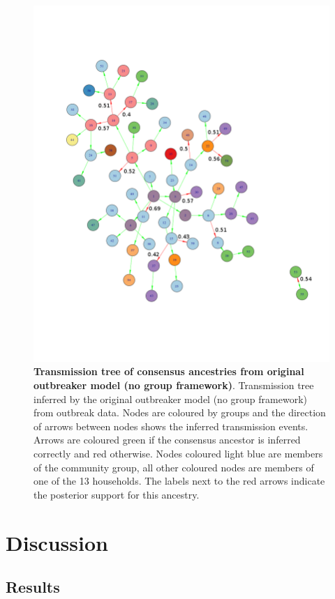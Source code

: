 \documentclass[11pt,a4paper]{report}
\begin{document}
\begin{figure}[h!]
\centering
\includegraphics[scale=0.5]{tree_no_grps.png} \newline
\caption{{\bf Transmission tree of consensus ancestries from original outbreaker model (no group framework)}. Transmission tree inferred by the original outbreaker model (no group framework) from outbreak data. Nodes are coloured by groups and the direction of arrows between nodes shows the inferred transmission events. Arrows are coloured green if the consensus ancestor is inferred correctly and red otherwise. Nodes coloured light blue are members of the community group, all other coloured nodes are members of one of the 13 households. The labels next to the red arrows indicate the posterior support for this ancestry.}
\end{figure}



\chapter{Discussion}
\section{Results}
\end{document}
